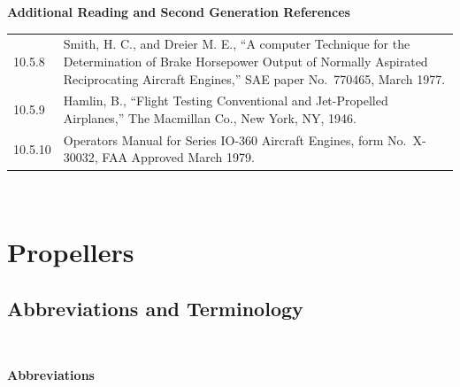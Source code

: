 \documentclass[
]{book}
\begin{document}
\textbf{Additional Reading and Second Generation References}

\begin{longtable}[]{@{}ll@{}}
\toprule
\endhead
\begin{minipage}[t]{0.06\columnwidth}\raggedright
10.5.8\strut
\end{minipage} & \begin{minipage}[t]{0.88\columnwidth}\raggedright
Smith, H. C., and Dreier M. E., ``A computer Technique for the Determination of Brake Horsepower Output of Normally Aspirated Reciprocating Aircraft Engines,'' SAE paper No.~770465, March 1977.\strut
\end{minipage}\tabularnewline
\begin{minipage}[t]{0.06\columnwidth}\raggedright
10.5.9\strut
\end{minipage} & \begin{minipage}[t]{0.88\columnwidth}\raggedright
Hamlin, B., ``Flight Testing Conventional and Jet-Propelled Airplanes,'' The Macmillan Co., New York, NY, 1946.\strut
\end{minipage}\tabularnewline
\begin{minipage}[t]{0.06\columnwidth}\raggedright
10.5.10\strut
\end{minipage} & \begin{minipage}[t]{0.88\columnwidth}\raggedright
Operators Manual for Series IO-360 Aircraft Engines, form No.~X-30032, FAA Approved March 1979.\strut
\end{minipage}\tabularnewline
\bottomrule
\end{longtable}

~

\hypertarget{propellers}{%
\chapter{Propellers}\label{propellers}}

\hypertarget{abbreviations-and-terminology}{%
\section{Abbreviations and Terminology}\label{abbreviations-and-terminology}}

~

\textbf{Abbreviations}
\end{document}
